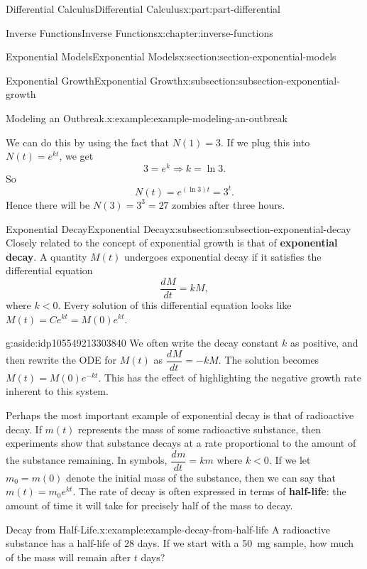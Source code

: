 \documentclass[twoside,10pt,]{book}
\newcommand{\terminology}[1]{\textbf{#1}}
\numberwithin{equation}{part}
\newcommand{\dv}[3][]{\dfrac{d^{#1} #2}{d #3^{#1}}}
\begin{document}
\begin{partptx}{Differential Calculus}{}{Differential Calculus}{}{}{x:part:part-differential}
\begin{chapterptx}{Inverse Functions}{}{Inverse Functions}{}{}{x:chapter:inverse-functions}
\begin{sectionptx}{Exponential Models}{}{Exponential Models}{}{}{x:section:section-exponential-models}
\begin{subsectionptx}{Exponential Growth}{}{Exponential Growth}{}{}{x:subsection:subsection-exponential-growth}
\begin{example}{Modeling an Outbreak.}{x:example:example-modeling-an-outbreak}
\par
We can do this by using the fact that \(N(1) = 3\). If we plug this into \(N(t) = e^{kt}\), we get%
\begin{equation*}
3 = e^{k} \Rightarrow k = \ln3.
\end{equation*}
So%
\begin{equation*}
N(t) = e^{(\ln 3)t} = 3^{t}.
\end{equation*}
Hence there will be \(N(3) = 3^{3} = 27\) zombies after three hours.%
\end{example}
\end{subsectionptx}
%
%
\typeout{************************************************}
\typeout{************************************************}
%
\begin{subsectionptx}{Exponential Decay}{}{Exponential Decay}{}{}{x:subsection:subsection-exponential-decay}
Closely related to the concept of exponential growth is that of \terminology{exponential decay}. A quantity \(M(t)\) undergoes exponential decay if it satisfies the differential equation%
\begin{equation*}
\dv{M}{t} = kM,
\end{equation*}
where \(k < 0\). Every solution of this differential equation looks like \(M(t) = Ce^{kt} = M(0)e^{kt}\).%
\begin{aside}{}{g:aside:idp105549213303840}%
We often write the decay constant \(k\) as positive, and then rewrite the ODE for \(M(t)\) as \(\dv{M}{t} = -kM\). The solution becomes \(M(t) = M(0)e^{-kt}\). This has the effect of highlighting the negative growth rate inherent to this system.%
\end{aside}
Perhaps the most important example of exponential decay is that of radioactive decay. If \(m(t)\) represents the mass of some radioactive substance, then experiments show that substance decays at a rate proportional to the amount of the substance remaining. In symbols, \(\dv{m}{t} = km\) where \(k < 0\). If we let \(m_{0} = m(0)\) denote the initial mass of the substance, then we can say that \(m(t) = m_{0}e^{kt}\). The rate of decay is often expressed in terms of \terminology{half-life}: the amount of time it will take for precisely half of the mass to decay.%
\begin{example}{Decay from Half-Life.}{x:example:example-decay-from-half-life}%
A radioactive substance has a half-life of \(28\) days. If we start with a \SI{50}{\milli\gram} sample, how much of the mass will remain after \(t\) days?%
\par\smallskip%

\end{example}
\end{subsectionptx}
\end{sectionptx}
\end{chapterptx}
\end{partptx}
\end{document}
